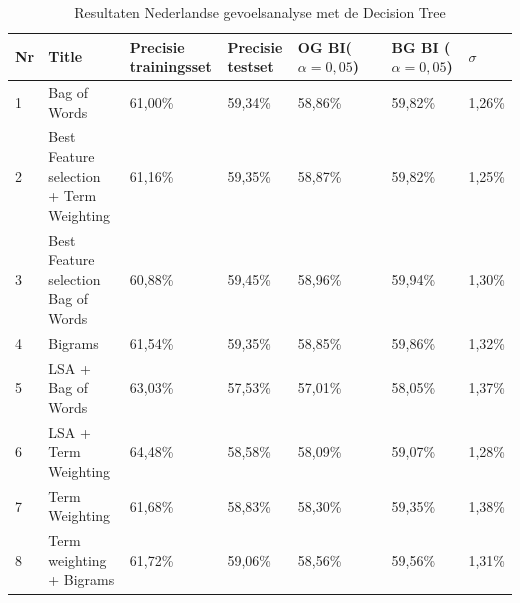 \begin{table}
\centering
\caption{Resultaten Nederlandse gevoelsanalyse met de Decision Tree}
\begin{adjustbox}{width=1\textwidth}
\begin{tabular}{|l|l|l|l|l|l|l|}
\hline
{\bf Nr} & {\bf Title}                                                                      & {\bf Precisie trainingsset} & {\bf Precisie testset} & {\bf OG BI($\alpha=0,05$)} & {\bf BG BI ($\alpha=0,05$)} & {\bf $\sigma$} \\ \hline
1        & Bag of Words                                                                     & 61,00\%                     & 59,34\%                & 58,86\%                 & 59,82\%                  & 1,26\%      \\ \hline
2        & Best Feature selection + Term Weighting                                          & 61,16\%                     & 59,35\%                & 58,87\%                 & 59,82\%                  & 1,25\%      \\ \hline
3        & Best Feature selection Bag of Words                                              & 60,88\%                     & 59,45\%                & 58,96\%                 & 59,94\%                  & 1,30\%      \\ \hline
4        & Bigrams                                                                          & 61,54\%                     & 59,35\%                & 58,85\%                 & 59,86\%                  & 1,32\%      \\ \hline
5        & LSA + Bag of Words                                                               & 63,03\%                     & 57,53\%                & 57,01\%                 & 58,05\%                  & 1,37\%      \\ \hline
6        & LSA + Term Weighting                                                             & 64,48\%                     & 58,58\%                & 58,09\%                 & 59,07\%                  & 1,28\%      \\ \hline
7        & Term Weighting                                                                   & 61,68\%                     & 58,83\%                & 58,30\%                 & 59,35\%                  & 1,38\%      \\ \hline
8        & Term weighting  + Bigrams                                                        & 61,72\%                     & 59,06\%                & 58,56\%                 & 59,56\%                  & 1,31\%      \\ \hline

\end{tabular}
\end{adjustbox}
\end{table}
